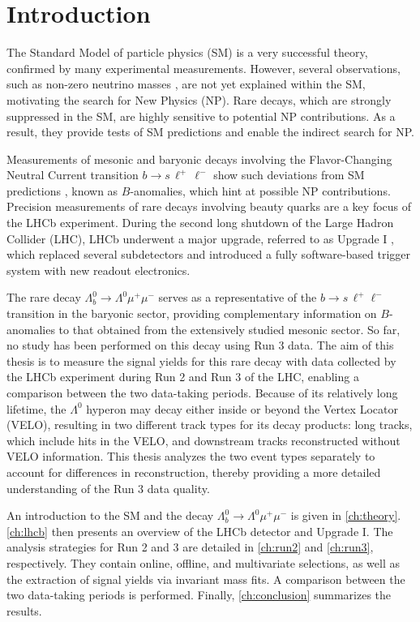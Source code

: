 \chapter{Introduction}
\label{ch:introduction}
The Standard Model of particle physics (SM) \cite{salam1959,glashow1959,weinberg1967} is a very successful theory, confirmed by many experimental measurements. However, several observations, such as non-zero neutrino masses \cite{neutrino_osc}, are not yet explained within the SM, motivating the search for New Physics (NP). Rare decays, which are strongly suppressed in the SM, are highly sensitive to potential NP contributions. As a result, they provide tests of SM predictions and enable the indirect search for NP.

Measurements of mesonic and baryonic decays involving the Flavor-Changing Neutral Current transition $b \to s \, \ell^+ \, \ell^-$ show such deviations from SM predictions \cite{b-anomalies_1, b-anomalies_2}, known as $B$-anomalies, which hint at possible NP contributions. Precision measurements of rare decays involving beauty quarks are a key focus of the LHCb experiment. During the second long shutdown of the Large Hadron Collider (LHC), LHCb underwent a major upgrade, referred to as Upgrade I \cite{lhcb_upgrade_I}, which replaced several subdetectors and introduced a fully software-based trigger system with new readout electronics.

The rare decay $\Lambda_b^0 \to \Lambda^0 \mu^+ \mu^-$ serves as a representative of the $b \to s \, \ell^+ \ell^-$ transition in the baryonic sector, providing complementary information on $B$-anomalies to that obtained from the extensively studied mesonic sector. So far, no study has been performed on this decay using Run 3 data. The aim of this thesis is to measure the signal yields for this rare decay with data collected by the LHCb experiment during Run 2 and Run 3 of the LHC, enabling a comparison between the two data-taking periods. Because of its relatively long lifetime, the $\Lambda^0$ hyperon may decay either inside or beyond the Vertex Locator (VELO), resulting in two different track types for its decay products: long tracks, which include hits in the VELO, and downstream tracks reconstructed without VELO information. This thesis analyzes the two event types separately to account for differences in reconstruction, thereby providing a more detailed understanding of the Run 3 data quality.

An introduction to the SM and the decay $\Lambda_b^0 \to \Lambda^0 \mu^+ \mu^-$ is given in \cref{ch:theory}. \cref{ch:lhcb} then presents an overview of the LHCb detector and Upgrade I. The analysis strategies for Run 2 and 3 are detailed in \cref{ch:run2} and \cref{ch:run3}, respectively. They contain online, offline, and multivariate selections, as well as the extraction of signal yields via invariant mass fits. A comparison between the two data-taking periods is performed. Finally, \cref{ch:conclusion} summarizes the results.
